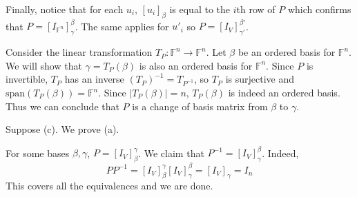 \documentclass{eh-homework}
\begin{document}
\begin{question}{8}
        Finally, notice that for each \(u_i\), \([u_i]_\beta\) is equal to the \(i\)th row of \(P\) which confirms that \(P = [I_{\mathbb{F}^n}]_\gamma^\beta\). The same applies for \(u'_i\) so \(P = [I_V]_{\gamma'}^{\beta'}\).

        Consider the linear transformation \(T_P : \mathbb{F}^n \to \mathbb{F}^n\). Let \(\beta\) be an ordered basis for \(\mathbb{F}^n\). We will show that \(\gamma = T_P(\beta)\) is also an ordered basis for \(\mathbb{F}^n\). Since \(P\) is invertible, \(T_P\) has an inverse \((T_P)^{-1} = T_{P^{-1}}\), so \(T_P\) is surjective and \(\mathrm{span} (T_P(\beta)) = \mathbb{F}^n\). Since \(|T_P(\beta)| = n\), \(T_P(\beta)\) is indeed an ordered basis. Thus we can conclude that \(P\) is a change of basis matrix from \(\beta\) to \(\gamma\).

        \medskip

        Suppose (c). We prove (a).

        For some bases \(\beta , \gamma\), \(P = [I_V]_\beta^\gamma\). We claim that \(P^{-1} = [I_V]_\gamma^{\beta}\). Indeed,
        \[
            P P^{-1} =  [I_V]_\beta^\gamma [I_V]_\gamma^{\beta} = [I_V]_\gamma = I_n
        \]
        This covers all the equivalences and we are done.
    \end{question}
\end{document}

